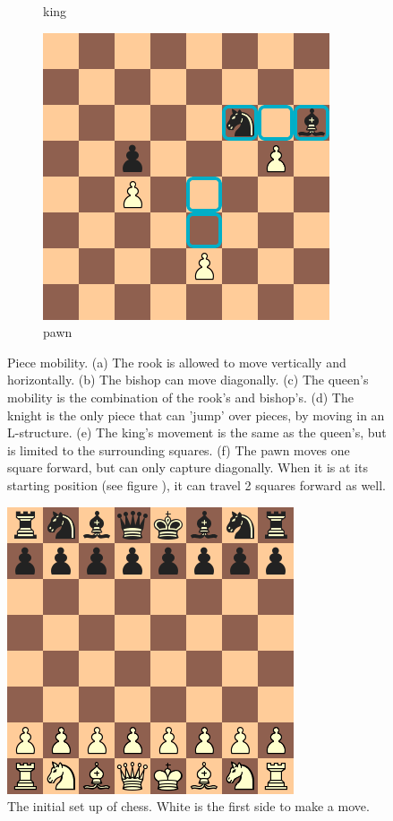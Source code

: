 \begin{figure}
\begin{subfigure}[b]{0.4\textwidth}
            \caption{king}
            \label{fig:king}
        \end{subfigure}
        \qquad
        \begin{subfigure}[b]{0.4\textwidth}
             \includegraphics[scale=0.5]{fig/rules/pawn}
            \caption{pawn}
            \label{fig:pawn}
        \end{subfigure}
        \caption[Piece mobility]{Piece mobility. (a) The rook is allowed to move vertically and horizontally. (b) The bishop can move diagonally. (c) The queen's mobility is the combination of the rook's and bishop's. (d) The knight is the only piece that can 'jump' over pieces, by moving in an L-structure. (e) The king's movement is the same as the queen's, but is limited to the surrounding squares. (f) The pawn moves one square forward, but can only capture diagonally. When it is at its starting position (see figure ), it can travel 2 squares forward as well.}
        \label{fig:pm}

\end{figure}

\begin{figure}
\centering
\includegraphics[scale=0.5]{fig/rules/initial}
\caption[Chess starting position]{The initial set up of chess. White is the first side to make a move.}
\label{fig:initial}
\end{figure}

